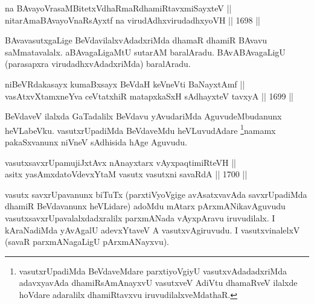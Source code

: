 
\begin{shl}
na BAvayoVrasaMBitetxVdhaRmaRdhamiRtavxmiSayxteV || \\
nitarAmaBAvayoVnaRsAyxtf na \footnotemark[1]virudAdhxvirudadhxyoVH \hfill || 1698 ||  
\end{shl}

\begin{artha}
BAvavasutxgaLige BeVdavilalxvAdadxriMda dhamaR dhamiR BAvavu saMmatavalalx. aBAvagaLigaMtU sutarAM baralAradu. BAvABAvagaLigU (parasapxra virudadhxvAdadxriMda) baralAradu.
\end{artha}

\begin{shl}
niBeVRdakasayx kumaBxsayx BeVdaH keVneVti BaNayxtAmf || \\
vasAtxvXtamxneYva ceVtatxhiR matapxkaSxH sAdhayxteV tavxyA \hfill || 1699 ||  
\end{shl}

\begin{artha}
BeVdaveV ilalxda GaTadalilx BeVdavu yAvudariMda AguvudeMbudanunx heVLabeVku. vasutxrUpadiMda BeVdaveMdu heVLuvudAdare \footnote{vasutxrUpadiMda BeVdaveMdare parxtiyoVgiyU vasutxvAdadadxriMda adavxyavAda dhamiRsAmAnayxvU vasutxveV AdiVtu dhamaRveV ilalxde hoVdare adaralilx dhamiRtavxvu iruvudilalxveMdathaR.}namamx pakaSxvanunx niVneV sAdhisida hAge Aguvudu.
\end{artha}

\begin{shl}
vasutxsavxrUpamujiJxtAvx nAnayxtarx vAyxpaqtimiRteVH || \\
asitx yasAmxdatoV\s devxYtaM vasutx vasutxni savaRdA \hfill || 1700 ||  
\end{shl}

\begin{artha}
vasutx savxrUpavanunx biTuTx (parxtiVyoVgige avAsatxvavAda savxrUpadiMda dhamiR BeVdavanunx heVLidare) adoMdu mAtarx pArxmANikavAguvudu vasutxsavxrUpavalalxdadxralilx parxmANada vAyxpAravu iruvudilalx. I kAraNadiMda yAvAgalU adevxYtaveV A vasutxvAgiruvudu. I vasutxvinalelxV (savaR parxmANagaLigU pArxmANayxvu).
\end{artha}

